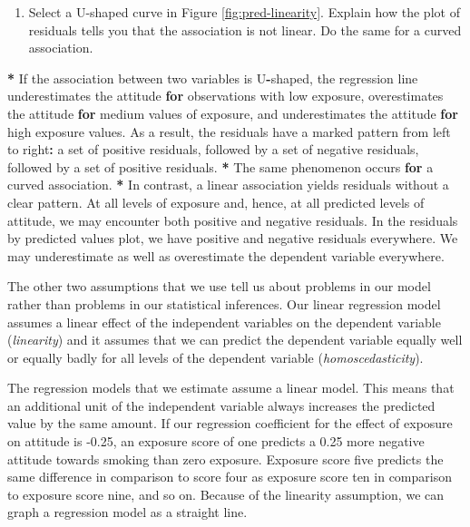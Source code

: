 \documentclass[a4paper]{book}
\newenvironment{Shaded}{\begin{snugshade}}{\end{snugshade}}
\newcommand{\StringTok}[1]{\textcolor[rgb]{0.00,0.00,0.00}{#1}}
\newcommand{\ControlFlowTok}[1]{\textcolor[rgb]{0.00,0.00,0.00}{\textbf{#1}}}
\newcommand{\OperatorTok}[1]{\textcolor[rgb]{0.00,0.00,0.00}{\textbf{#1}}}
\newcommand{\NormalTok}[1]{#1}
\providecommand{\tightlist}{%
  \setlength{\itemsep}{0pt}\setlength{\parskip}{0pt}}
\theoremstyle{definition}
\theoremstyle{definition}
\theoremstyle{definition}
\theoremstyle{remark}
\begin{document}
\begin{enumerate}
\def\labelenumi{\arabic{enumi}.}
\setcounter{enumi}{1}
\tightlist
\item
  Select a U-shaped curve in Figure \ref{fig:pred-linearity}. Explain
  how the plot of residuals tells you that the association is not
  linear. Do the same for a curved association.
\end{enumerate}

\begin{Shaded}
\begin{Highlighting}[]
\OperatorTok{*}\StringTok{ }\NormalTok{If the association between two variables is U}\OperatorTok{-}\NormalTok{shaped, the regression line}
\NormalTok{underestimates the attitude }\ControlFlowTok{for}\NormalTok{ observations with low exposure, overestimates}
\NormalTok{the attitude }\ControlFlowTok{for}\NormalTok{ medium values of exposure, and underestimates the attitude}
\ControlFlowTok{for}\NormalTok{ high exposure values. As a result, the residuals have a marked pattern}
\NormalTok{from left to right}\OperatorTok{:}\StringTok{ }\NormalTok{a set of positive residuals, followed by a set of negative}
\NormalTok{residuals, followed by a set of positive residuals.}
\OperatorTok{*}\StringTok{ }\NormalTok{The same phenomenon occurs }\ControlFlowTok{for}\NormalTok{ a curved association.}
\OperatorTok{*}\StringTok{ }\NormalTok{In contrast, a linear association yields residuals without a clear pattern.}
\NormalTok{At all levels of exposure and, hence, at all predicted levels of attitude, we}
\NormalTok{may encounter both positive and negative residuals. In the residuals by}
\NormalTok{predicted values plot, we have positive and negative residuals everywhere. We}
\NormalTok{may underestimate as well as overestimate the dependent variable everywhere.}
\end{Highlighting}
\end{Shaded}

The other two assumptions that we use tell us about problems in our
model rather than problems in our statistical inferences. Our linear
regression model assumes a linear effect of the independent variables on
the dependent variable (\emph{linearity}) and it assumes that we can
predict the dependent variable equally well or equally badly for all
levels of the dependent variable (\emph{homoscedasticity}).

The regression models that we estimate assume a linear model. This means
that an additional unit of the independent variable always increases the
predicted value by the same amount. If our regression coefficient for
the effect of exposure on attitude is -0.25, an exposure score of one
predicts a 0.25 more negative attitude towards smoking than zero
exposure. Exposure score five predicts the same difference in comparison
to score four as exposure score ten in comparison to exposure score
nine, and so on. Because of the linearity assumption, we can graph a
regression model as a straight line.
\end{document}

